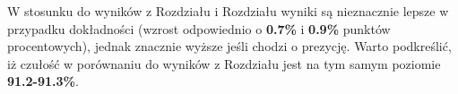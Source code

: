 W stosunku do wyników z Rozdziału  i Rozdziału  wyniki są nieznacznie lepsze w przypadku dokładności (wzrost odpowiednio o \textbf{0.7\%} i \textbf{0.9\%} punktów procentowych), jednak znacznie wyższe jeśli chodzi o prezycję. Warto podkreślić, iż czułość w porównaniu do wyników z Rozdziału  jest na tym samym poziomie \textbf{91.2-91.3\%}.
